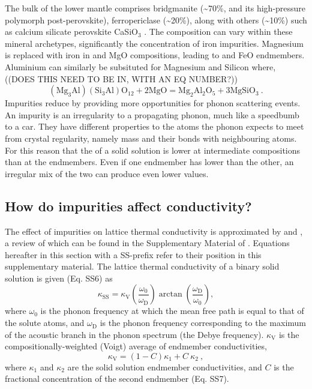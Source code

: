 The bulk of the lower mantle comprises bridgmanite (\textasciitilde70\%, and its high-pressure polymorph post-perovskite), ferropericlase (\textasciitilde20\%), along with others (\textasciitilde10\%) such as calcium silicate perovskite CaSiO$_3$ \citep{Tronnes2009}. The composition can vary within these mineral archetypes, significantly the concentration of iron impurities. Magnesium is replaced with iron in 
\mgsios and MgO compositions, leading to \fesios and FeO endmembers. Aluminium can similarly be subsituted for Magnesium and Silicon
\citep[as in][]{Brodholt2000} where, ((DOES THIS NEED TO BE IN, WITH AN EQ NUMBER?))
%
\begin{equation}
\mathrm{ \left ( Mg_{3}Al \right )\left ( Si_{3}Al \right )O_{12} + 2MgO = Mg_{2}Al_{2}O_{5} + 3MgSiO_{3} }\ .
\label{eq.brodholt_al}
\end{equation}
%
Impurities reduce \tcs by providing more opportunities for phonon scattering events. An impurity is an irregularity to a propagating phonon, much like a speedbumb to a car. They have different properties to the atoms the phonon expects to meet from crystal regularity, namely mass and their bonds with neighbouring atoms. For this reason that the \tcs of a solid solution is lower at intermediate compositions than at the endmembers. Even if one endmember has lower \cs than the other, an irregular mix of the two can produce even lower values.


\subsection{How do impurities affect conductivity?} 
\label{impur_theory}

The effect of impurities on lattice thermal conductivity is approximated by \citet{Klemens1960} and \citet{Padture1997}, a review of which can be found in the Supplementary Material of \citet{Stackhouse2015}. Equations hereafter in this section with a SS-prefix refer to their position in this supplementary material. The lattice thermal conductivity of a binary solid solution is given (Eq. SS6) as
%
\begin{equation}
\kappa_{\mathrm{SS}}=\kappa_{\mathrm{V}}\left ( \frac{\omega_{\mathrm{0}}}{\omega_{\mathrm{D}}} \right )\arctan \left ( \frac{\omega_{\mathrm{D}}}{\omega_{\mathrm{0}}} \right ),
\label{eq.SS2015SM.6}
\end{equation}
%
where $\omega_{\mathrm{0}}$ is the phonon frequency at which the mean free path is equal to that of the solute atoms, and $\omega_{\mathrm{D}}$ is the phonon frequency corresponding to the maximum of the acoustic branch in the phonon spectrum (the Debye frequency). $\kappa_{\mathrm{V}}$ is the compositionally-weighted (Voigt) average of endmember conductivities, 
%
\begin{equation}
\kappa_{\mathrm{V}}=\left ( 1-C \right )\kappa_{1} + C\ \kappa_{2} \ ,
\label{eq.SS2015SM.7}
\end{equation}
%
where $\kappa_{\mathrm{1}}$ and $\kappa_{\mathrm{2}}$ are the solid solution endmember conductivities, and $C$ is the fractional concentration of the second endmember (Eq. SS7).

